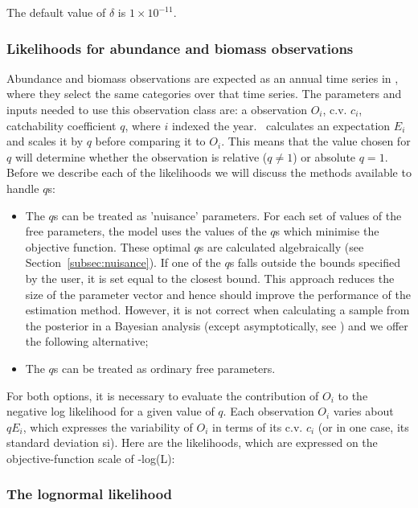 The default value of $\delta$ is $1 \times 10^{-11}$.


\subsubsection{Likelihoods for abundance and biomass observations}\label{Obs:biomass}

Abundance and biomass observations are expected as an annual time series in \CNAME, where they select the same categories over that time series. The parameters and inputs needed to use this observation class are: a observation $O_i$, c.v. $c_i$, catchability coefficient $q$, where $i$ indexed the year. \CNAME\ calculates an expectation $E_i$ and scales it by $q$ before comparing it to $O_i$. This means that the value chosen for $q$ will determine whether the observation is relative ($q\neq 1$) or absolute $q = 1$. Before we describe each of the likelihoods we will discuss the methods available to handle $q$s:

\begin{itemize}
	\item The $q$s can be treated as 'nuisance' parameters. For each set of values of the free parameters, the model uses the values of the $q$s which minimise the objective function. These optimal $q$s are calculated algebraically (see Section~\ref{subsec:nuisance}). If one of the $q$s falls outside the bounds specified by the user, it is set equal to the closest bound. This approach reduces the size of the parameter vector and hence should improve the performance of the estimation method. However, it is not correct when calculating a sample from the posterior in a Bayesian analysis (except asymptotically, see \cite{Walters_ludwig_94}) and we offer the following alternative;

	\item The $q$s can be treated as ordinary free parameters.
\end{itemize}

For both options, it is necessary to evaluate the contribution of $O_i$ to the negative log likelihood for a given value of $q$. Each observation $O_i$ varies about $qE_i$, which expresses the variability of $O_i$ in terms of its c.v. $c_i$ (or in one case, its standard deviation si). Here are the likelihoods, which are expressed on the objective-function scale of -log(L):

\subsubsection*{The lognormal likelihood}

